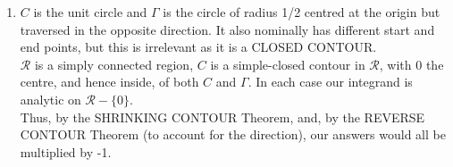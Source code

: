 \begin{enumerate}[label=(\alph*)]
    \item 
    $C$ is the unit circle and $\Gamma$ is the circle of radius 1/2 centred at the origin but traversed in the opposite direction. It also nominally has different start and end points, but this is irrelevant as it is a CLOSED CONTOUR.
    \vs \\
    $ \mathcal{R} $ is a simply connected region, $C$ is a simple-closed contour in $ \mathcal{R} $, with 0 the centre, and hence inside, of both $C$ and $\Gamma$. In each case our integrand is analytic on $ \mathcal{R} - \{ 0 \} $.
    \vs \\
    Thus, by the SHRINKING CONTOUR Theorem, and, by the REVERSE CONTOUR Theorem (to account for the direction), our answers would all be multiplied by -1.
\end{enumerate}
